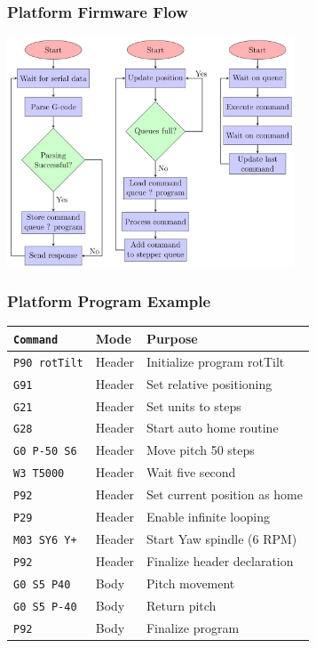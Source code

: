 \documentclass[aspectratio=169]{beamer}
\begin{document}
\begin{frame}[fragile]
  \frametitle{Platform Firmware Flow}

  \centering
  \includegraphics[width=0.64\textwidth]{../img/platform_flow.png}

\end{frame}

\begin{frame}[fragile]
  \frametitle{Platform Program Example}
  \begin{tabular}{lll}
    \hline
    \texttt{Command}     & Mode   & Purpose                      \\
    \hline
    \texttt{P90 rotTilt} & Header & Initialize program rotTilt   \\
    \texttt{G91}         & Header & Set relative positioning     \\
    \texttt{G21}         & Header & Set units to steps           \\
    \texttt{G28}         & Header & Start auto home routine      \\
    \texttt{G0 P-50 S6}  & Header & Move pitch 50 steps          \\
    \texttt{W3 T5000}    & Header & Wait five second             \\
    \texttt{P92}         & Header & Set current position as home \\
    \texttt{P29}         & Header & Enable infinite looping      \\
    \texttt{M03 SY6 Y+}  & Header & Start Yaw spindle (6 RPM)    \\
    \texttt{P92}         & Header & Finalize header declaration  \\
    \texttt{G0 S5 P40}   & Body   & Pitch movement               \\
    \texttt{G0 S5 P-40}  & Body   & Return pitch                 \\
    \texttt{P92}         & Body   & Finalize program             \\
    \hline
  \end{tabular}
\end{frame}
\end{document}
